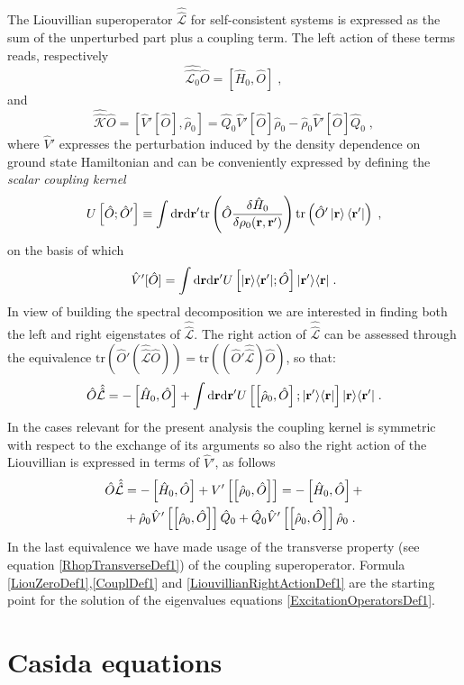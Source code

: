 \documentclass[reprint,aps,prb]{revtex4-1}
\newcommand{\dd}{{\rm d}}
\renewcommand{\r}{{\bf r}}
\newcommand{\be}{\begin{equation}}
\newcommand{\ee}{\end{equation}}
\newcommand{\nn}{\notag}
\newcommand{\lb}{\label}
\newcommand{\op}[1]{\hat {#1}}
\newcommand{\sop}[1]{\op{\op {#1}}}
\newcommand{\commutator}[2]{\left[ {#1} , {#2} \right]}
\newcommand{\trace}[1]{\mathrm{tr}\left(#1\right)}
\newcommand{\ketbra}[2]{| #1 \rangle \langle #2 |}
\newcommand{\dmnot}{\op{\rho}_0}
\newcommand{\hnot}{\op{H}_0}
\newcommand{\Liouv}{\sop{\mathcal L}}
\newcommand{\Liouvnot}{\sop{\mathcal L_0}}
\newcommand{\coupl}{\sop{\mathcal K}}
\begin{document}
The Liouvillian superoperator $\Liouv$ for self-consistent systems is expressed as the sum of the unperturbed part plus a coupling term. The left action of these 
terms reads, respectively
\be\lb{LiouZeroDef1}
\Liouvnot \op O = \commutator{\hnot}{\op O} \;,
\ee
and
\be\lb{CouplDef1}
\coupl\op O = \commutator{\op V'[\op O]}{\dmnot}  = \op Q_0\op V'[\op O]\dmnot - \dmnot\op V'[\op O]\op Q_0 \;,
\ee
where $\op V'$ expresses the perturbation induced by the density dependence on ground state Hamiltonian and can be conveniently expressed by defining the 
\emph{scalar coupling kernel}
\be\lb{CouplingKernelDef1}
U\left[\op O; \op O'\right] \equiv  \int \dd \r \dd \r' \trace{\op O \frac{\delta \hnot }{\delta \rho_0(\r,\r')}
} \trace{\op O' \ket{\r} \bra{\r'}} \;, \nn
\ee
on the basis of which
\be\lb{VpDef1}
\op V'[\op O]= 
\int \dd \r \dd \r' U\left[\ketbra{\r}{\r'};\op O\right] \ketbra{\r'}{\r}\;.
\ee
In view of building the spectral decomposition we are interested in finding both the left and right eigenstates of $\Liouv$.   
The right action of $\Liouv$ can be assessed through the equivalence $\trace{\op O'(\Liouv\op O)} = \trace{(\op O'\Liouv)\op O}$, so that:
\be
\op O\Liouv = -\commutator{\hnot}{\op O} + \int \dd\r\dd\r'
U\left[\commutator{\dmnot}{\op O};\ketbra{\r'}{\r}\right]\ketbra{\r}{\r'} \;. \nn
\ee
In the cases relevant for the present analysis the coupling kernel is symmetric with respect to the exchange of its arguments so also the right action of the 
Liouvillian is expressed in terms of $\op V'$, as follows
\begin{align}\lb{LiouvillianRightActionDef1}
\op O\Liouv &= -\commutator{\hnot}{\op O} + V'\left[\commutator{{\dmnot}}{\op O}\right] = -\commutator{\hnot}{\op O} + \nn \\ 
&+ \dmnot\op V'\left[\commutator{{\dmnot}}{\op O}\right]\op Q_0 + \op Q_0\op V'\left[\commutator{\dmnot}{\op O}\right]\dmnot \;.
\end{align}
In the last equivalence we have made usage of the transverse property (see equation \eqref{RhopTransverseDef1}) of the coupling superoperator. Formula 
\eqref{LiouZeroDef1},\eqref{CouplDef1} and \eqref{LiouvillianRightActionDef1} are the starting point for the solution of the eigenvalues equations \eqref{ExcitationOperatorsDef1}. 

\section{Casida equations}
\end{document}
